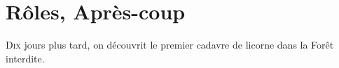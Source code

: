 \chapter{Rôles, Après-coup}

\lettrine{D}{ix} jours plus tard, on découvrit le premier cadavre de licorne dans la Forêt interdite. 
